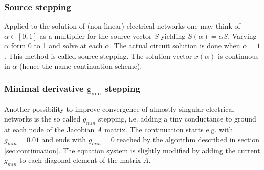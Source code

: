 \subsubsection{Source stepping}

Applied to the solution of (non-linear) electrical networks one may
think of $\alpha \in [0,1]$ as a multiplier for the source vector $S$
yielding $S\left(\alpha\right) = \alpha S$.  Varying $\alpha$ form 0
to 1 and solve at each $\alpha$.  The actual circuit solution is done
when $\alpha = 1$.  This method is called source stepping.  The
solution vector $x\left(\alpha\right)$ is continuous in $\alpha$
(hence the name continuation scheme).

\subsubsection{Minimal derivative $\mathrm{g_{min}}$ stepping}

Another possibility to improve convergence of almostly singular
electrical networks is the so called $g_{min}$ stepping, i.e. adding a
tiny conductance to ground at each node of the Jacobian $A$ matrix.
The continuation starts e.g. with $g_{min} = 0.01$ and ends with
$g_{min} = 0$ reached by the algorithm described in section
\ref{sec:continuation}.  The equation system is slightly modified by
adding the current $g_{min}$ to each diagonal element of the matrix
$A$.
